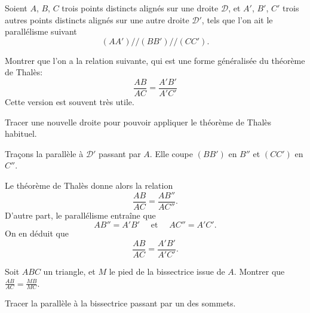 \begin{exo}
Soient $A$, $B$, $C$ trois points distincts alignés sur une droite $\mathcal D$, et $A'$, $B'$, $C'$ trois autres points distincts alignés sur une autre droite $\mathcal D'$, tels que l'on ait le parallélisme suivant
\[ (AA')// (BB')//(CC').\]
\begin{center}
\end{center}
Montrer que l'on a la relation suivante, qui est une forme généralisée du théorème de Thalès:
\[ \frac{AB}{AC} = \frac{A'B'}{A'C'}\]
Cette version est souvent très utile.
\begin{hint}
Tracer une nouvelle droite pour pouvoir appliquer le théorème de Thalès habituel.
\end{hint}
\begin{sol}
Traçons la parallèle à $\mathcal D'$ passant par $A$. Elle coupe $(BB')$ en $B''$ et $(CC')$ en $C''$. 

\begin{center}
\begin{tikzpicture}
\end{tikzpicture}
\end{center}

Le théorème de Thalès donne alors la relation
\[ \frac{AB}{AC} = \frac{AB''}{AC''}.\]
D'autre part, le parallélisme entraîne que 
\[ AB'' = A'B' \quad \text{ et }\quad AC''=A'C'.\]
On en déduit que 
\[ \frac{AB}{AC} = \frac{A'B'}{A'C'}.\]

\end{sol}
\end{exo}

\begin{exo}

Soit $ABC$ un triangle, et $M$ le pied de la bissectrice issue de $A$. Montrer que $\frac{AB}{AC}=\frac{MB}{MC}$.
\begin{center}
\end{center}
\begin{hint}
Tracer la parallèle à la bissectrice passant par un des sommets.
\end{hint}
\begin{sol}
\end{sol}
\end{exo}




